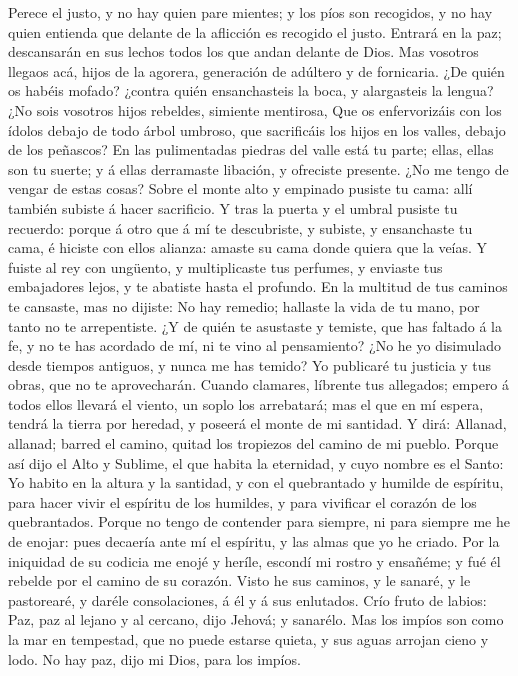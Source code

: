  Perece el justo, y no hay quien pare mientes; y los píos
son recogidos, y no hay quien entienda que delante de la aflicción es
recogido el justo.  Entrará en la paz; descansarán en sus
lechos todos los que andan delante de Dios.  Mas vosotros
llegaos acá, hijos de la agorera, generación de adúltero y de
fornicaria.  ¿De quién os habéis mofado? ¿contra quién
ensanchasteis la boca, y alargasteis la lengua? ¿No sois vosotros hijos
rebeldes, simiente mentirosa,  Que os enfervorizáis con los
ídolos debajo de todo árbol umbroso, que sacrificáis los hijos en los
valles, debajo de los peñascos?  En las pulimentadas piedras
del valle está tu parte; ellas, ellas son tu suerte; y á ellas
derramaste libación, y ofreciste presente. ¿No me tengo de vengar de
estas cosas?  Sobre el monte alto y empinado pusiste tu
cama: allí también subiste á hacer sacrificio.  Y tras la
puerta y el umbral pusiste tu recuerdo: porque á otro que á mí te
descubriste, y subiste, y ensanchaste tu cama, é hiciste con ellos
alianza: amaste su cama donde quiera que la veías.  Y fuiste
al rey con ungüento, y multiplicaste tus perfumes, y enviaste tus
embajadores lejos, y te abatiste hasta el profundo.  En la
multitud de tus caminos te cansaste, mas no dijiste: No hay remedio;
hallaste la vida de tu mano, por tanto no te arrepentiste. 
¿Y de quién te asustaste y temiste, que has faltado á la fe, y no te has
acordado de mí, ni te vino al pensamiento? ¿No he yo disimulado desde
tiempos antiguos, y nunca me has temido?  Yo publicaré tu
justicia y tus obras, que no te aprovecharán.  Cuando
clamares, líbrente tus allegados; empero á todos ellos llevará el
viento, un soplo los arrebatará; mas el que en mí espera, tendrá la
tierra por heredad, y poseerá el monte de mi santidad.  Y
dirá: Allanad, allanad; barred el camino, quitad los tropiezos del
camino de mi pueblo.  Porque así dijo el Alto y Sublime, el
que habita la eternidad, y cuyo nombre es el Santo: Yo habito en la
altura y la santidad, y con el quebrantado y humilde de espíritu, para
hacer vivir el espíritu de los humildes, y para vivificar el corazón de
los quebrantados.  Porque no tengo de contender para
siempre, ni para siempre me he de enojar: pues decaería ante mí el
espíritu, y las almas que yo he criado.  Por la iniquidad
de su codicia me enojé y heríle, escondí mi rostro y ensañéme; y fué él
rebelde por el camino de su corazón.  Visto he sus caminos,
y le sanaré, y le pastorearé, y daréle consolaciones, á él y á sus
enlutados.  Crío fruto de labios: Paz, paz al lejano y al
cercano, dijo Jehová; y sanarélo.  Mas los impíos son como
la mar en tempestad, que no puede estarse quieta, y sus aguas arrojan
cieno y lodo.  No hay paz, dijo mi Dios, para los impíos.

